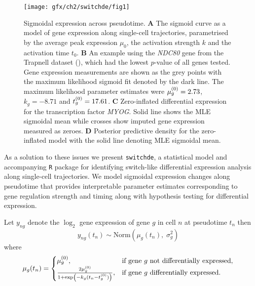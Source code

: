 \begin{figure}[!h]
\centering
\texttt{[image: gfx/ch2/switchde/fig1]}
\caption{Sigmoidal expression across pseudotime.
\textbf{A} The sigmoid curve as a model of gene expression along single-cell trajectories, parametrised by the average peak expression $\mu_0$, the activation strength $k$ and the activation time $t_0$.
\textbf{B} An example using the \emph{NDC80} gene from the Trapnell dataset (\cite{Trapnell2014-xi}), which had the lowest $p$-value of all genes tested. Gene expression measurements are shown as the grey points with the maximum likelihood sigmoid fit denoted by the dark line. The maximum likelihood parameter estimates were ${\mu^{(0)}_g} = 2.73$, $k_g = -8.71$ and ${t^{(0)}_g} = 17.61$.
\textbf{C} Zero-inflated differential expression for the transcription factor \emph{MYOG}. Solid line shows the MLE sigmoidal mean while  crosses show imputed gene expression measured as zeroes.
\textbf{D} Posterior predictive density for the zero-inflated model with the solid line denoting MLE sigmoidal mean.
}\label{fig:01}
\end{figure}


As a solution to these issues we present \texttt{switchde}, a statistical model and accompanying \texttt{R} package for identifying switch-like differential expression analysis along single-cell trajectories. We model sigmoidal expression changes along pseudotime that provides interpretable parameter estimates corresponding to gene regulation strength and timing along with hypothesis testing for differential expression.



Let $y_{ng}$ denote the $\log_2$ gene expression of gene $g$ in cell $n$ at pseudotime $t_n$ then
\begin{equation} \label{eq:nzi}
y_{ng}(t_n) \sim \mathrm{Norm}(\mu_g(t_n), \; \sigma_g^2)
\end{equation}
where
\begin{equation}
    \mu_g(t_n) =
\begin{cases}
    \hfil  \mu^{(0)}_g, & \text{if } \text{gene $g$ not differentially expressed},  \\
    \frac{2 \mu^{(0)}_g}{1 + \exp\left(-k_g(t_n - t^{(0)}_g)\right)}, &  \text{if gene $g$ differentially expressed}.
\end{cases}
\end{equation}

